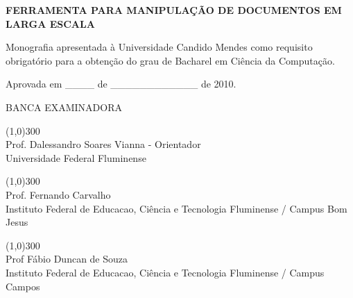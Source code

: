 \thispagestyle{empty}

\begin{spacing}{1.0}

\begin{center}
\end{center}

\vspace {1.0 cm}

\begin{center}
\begin{Large}
{\bf \uppercase{Ferramenta para manipulação de documentos em larga escala}
} \\[0.2 cm]
\end{Large}
\end{center}

\vspace {1.0 cm}

\begin{flushright}
\begin{minipage}[t]{8.5 cm}
Monografia apresentada à Universidade Candido Mendes como requisito obrigatório para a obtenção do grau de Bacharel em Ciência da Computação.
\end{minipage}
\end{flushright}

\vspace {1.5 cm}

\begin{center}
\begin{large}
Aprovada em \_\_\_\_ de \_\_\_\_\_\_\_\_\_\_\_\_ de 2010. \\[0.2 cm]
\end{large}
\end{center}

\vspace {1.5 cm}

\begin{center}
\begin{large}
BANCA EXAMINADORA \\[0.2 cm]
\end{large}
\end{center}

\vspace {1 cm}

\begin{center}
\line(1,0){300}\\ 
Prof. Dalessandro Soares Vianna - Orientador \\
Universidade Federal Fluminense\\

\end{center}

\vspace {1.0 cm}

\begin{center}
\line(1,0){300}\\ 
Prof. Fernando Carvalho\\
Instituto Federal de Educacao, Ciência e Tecnologia Fluminense / Campus Bom Jesus
\end{center}

\vspace {1.0 cm}

\begin{center}
\line(1,0){300}\\
Prof Fábio Duncan de Souza\\
Instituto Federal de Educacao, Ciência e Tecnologia Fluminense / Campus Campos\\
\end{center}

\end{spacing}
\newpage
